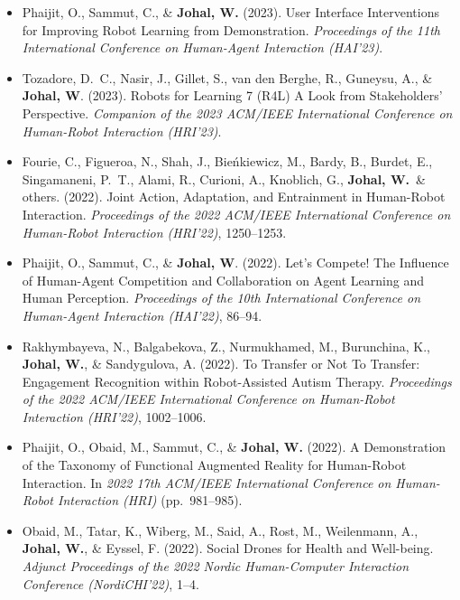 \begin{itemize}[nosep]
    \item Phaijit, O., Sammut, C., \& \textbf{Johal, W.} (2023). User Interface Interventions for Improving Robot Learning from Demonstration. \textit{Proceedings of the 11th International Conference on Human-Agent Interaction (HAI'23)}.

    \item Tozadore, D.\ C., Nasir, J., Gillet, S., van den Berghe, R., Guneysu, A., \& \textbf{Johal, W}. (2023). Robots for Learning 7 (R4L) A Look from Stakeholders' Perspective. \textit{Companion of the 2023 ACM/IEEE International Conference on Human-Robot Interaction (HRI'23)}.

    \item Fourie, C., Figueroa, N., Shah, J., Bieńkiewicz, M., Bardy, B., Burdet, E., Singamaneni, P.\ T., Alami, R., Curioni, A., Knoblich, G., \textbf{Johal, W.}\ \& others. (2022). Joint Action, Adaptation, and Entrainment in Human-Robot Interaction. \textit{Proceedings of the 2022 ACM/IEEE International Conference on Human-Robot Interaction (HRI'22)}, 1250--1253.

    \item Phaijit, O., Sammut, C., \& \textbf{Johal, W}. (2022). Let's Compete! The Influence of Human-Agent Competition and Collaboration on Agent Learning and Human Perception. \textit{Proceedings of the 10th International Conference on Human-Agent Interaction (HAI'22)}, 86--94.

    \item Rakhymbayeva, N., Balgabekova, Z., Nurmukhamed, M., Burunchina, K., \textbf{Johal, W.}, \& Sandygulova, A. (2022). To Transfer or Not To Transfer: Engagement Recognition within Robot-Assisted Autism Therapy. \textit{Proceedings of the 2022 ACM/IEEE International Conference on Human-Robot Interaction (HRI'22)}, 1002--1006.

    \item Phaijit, O., Obaid, M., Sammut, C., \& \textbf{Johal, W.} (2022). A Demonstration of the Taxonomy of Functional Augmented Reality for Human-Robot Interaction. In \textit{2022 17th ACM/IEEE International Conference on Human-Robot Interaction (HRI)} (pp.\ 981--985).

    \item Obaid, M., Tatar, K., Wiberg, M., Said, A., Rost, M., Weilenmann, A., \textbf{Johal, W.}, \& Eyssel, F. (2022). Social Drones for Health and Well-being. \textit{Adjunct Proceedings of the 2022 Nordic Human-Computer Interaction Conference (NordiCHI'22)}, 1--4.


\end{itemize}
